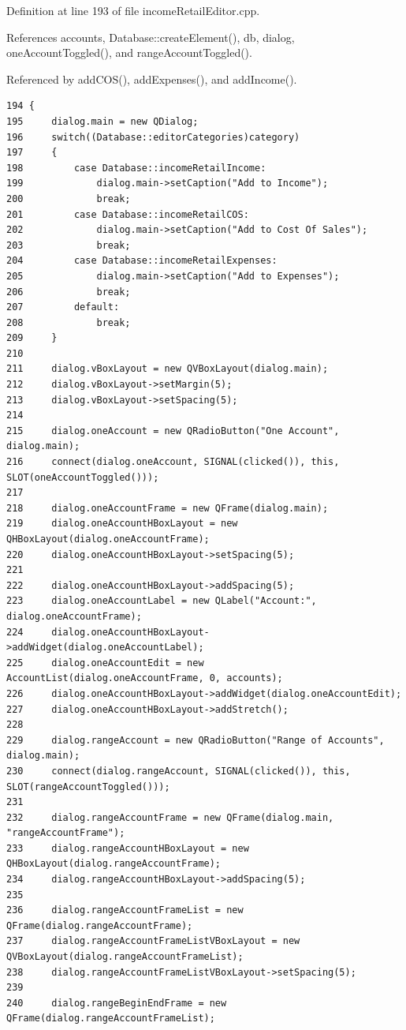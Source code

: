 Definition at line 193 of file income\-Retail\-Editor.cpp.

References accounts, Database::create\-Element(), db, dialog, one\-Account\-Toggled(), and range\-Account\-Toggled().

Referenced by add\-COS(), add\-Expenses(), and add\-Income().

\footnotesize\begin{verbatim}194 {
195     dialog.main = new QDialog;
196     switch((Database::editorCategories)category)
197     {
198         case Database::incomeRetailIncome:
199             dialog.main->setCaption("Add to Income");
200             break;
201         case Database::incomeRetailCOS:
202             dialog.main->setCaption("Add to Cost Of Sales");
203             break;
204         case Database::incomeRetailExpenses:
205             dialog.main->setCaption("Add to Expenses");
206             break;
207         default:
208             break;
209     }
210     
211     dialog.vBoxLayout = new QVBoxLayout(dialog.main);
212     dialog.vBoxLayout->setMargin(5);
213     dialog.vBoxLayout->setSpacing(5);
214     
215     dialog.oneAccount = new QRadioButton("One Account", dialog.main);
216     connect(dialog.oneAccount, SIGNAL(clicked()), this, SLOT(oneAccountToggled()));
217         
218     dialog.oneAccountFrame = new QFrame(dialog.main);
219     dialog.oneAccountHBoxLayout = new QHBoxLayout(dialog.oneAccountFrame);
220     dialog.oneAccountHBoxLayout->setSpacing(5);
221     
222     dialog.oneAccountHBoxLayout->addSpacing(5);
223     dialog.oneAccountLabel = new QLabel("Account:", dialog.oneAccountFrame);
224     dialog.oneAccountHBoxLayout->addWidget(dialog.oneAccountLabel);
225     dialog.oneAccountEdit = new AccountList(dialog.oneAccountFrame, 0, accounts);
226     dialog.oneAccountHBoxLayout->addWidget(dialog.oneAccountEdit);
227     dialog.oneAccountHBoxLayout->addStretch();
228        
229     dialog.rangeAccount = new QRadioButton("Range of Accounts", dialog.main);
230     connect(dialog.rangeAccount, SIGNAL(clicked()), this, SLOT(rangeAccountToggled()));
231        
232     dialog.rangeAccountFrame = new QFrame(dialog.main, "rangeAccountFrame");
233     dialog.rangeAccountHBoxLayout = new QHBoxLayout(dialog.rangeAccountFrame);
234     dialog.rangeAccountHBoxLayout->addSpacing(5);
235     
236     dialog.rangeAccountFrameList = new QFrame(dialog.rangeAccountFrame);
237     dialog.rangeAccountFrameListVBoxLayout = new QVBoxLayout(dialog.rangeAccountFrameList);
238     dialog.rangeAccountFrameListVBoxLayout->setSpacing(5);
239     
240     dialog.rangeBeginEndFrame = new QFrame(dialog.rangeAccountFrameList);

\end{verbatim}
